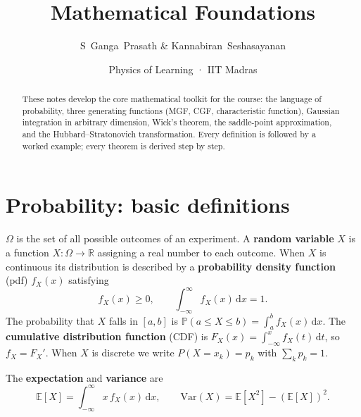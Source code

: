 \documentclass[justified,notoc]{tufte-handout}
\title{Mathematical Foundations}
\author{S~Ganga~Prasath \& Kannabiran~Seshasayanan}
\date{Physics of Learning · IIT Madras}
\def\d{\mathrm{d}}
\def\E{\mathbb{E}}
\def\var{\mathrm{Var}}
\def\P{\mathbb{P}}
\begin{document}
\maketitle

\begin{abstract}
\noindent
These notes develop the core mathematical toolkit for the course: the language of probability, three generating functions (MGF, CGF, characteristic function), Gaussian integration in arbitrary dimension, Wick's theorem, the saddle-point approximation, and the Hubbard--Stratonovich transformation. Every definition is followed by a worked example; every theorem is derived step by step.
\end{abstract}

\section{Probability: basic definitions}

 $\Omega$ is the set of all possible outcomes of an experiment. A \textbf{random variable} $X$ is a function $X:\Omega\to\mathbb{R}$ assigning a real number to each outcome. When $X$ is continuous its distribution is described by a \textbf{probability density function} (pdf) $f_X(x)$ satisfying
\begin{equation}
  f_X(x)\geq 0, \qquad \int_{-\infty}^{\infty} f_X(x)\,\d x = 1.
\end{equation}
The probability that $X$ falls in $[a,b]$ is $\P(a\leq X\leq b)=\int_a^b f_X(x)\,\d x$. The \textbf{cumulative distribution function} (CDF) is $F_X(x)=\int_{-\infty}^x f_X(t)\,\d t$, so $f_X=F_X'$. When $X$ is discrete we write $P(X=x_k)=p_k$ with $\sum_k p_k=1$.

The \textbf{expectation} and \textbf{variance} are
\begin{equation}
  \E[X]=\int_{-\infty}^{\infty} x\,f_X(x)\,\d x, \qquad
  \var(X)=\E[X^2]-(\E[X])^2.
\end{equation}
\end{document}

